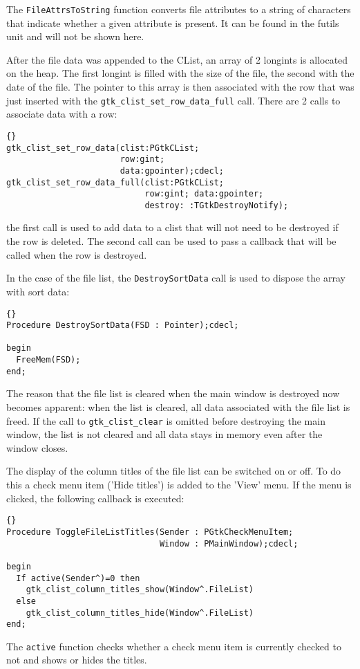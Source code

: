 \documentclass[10pt]{article}
\newcommand{\file}[1]{\textsf{#1}}
\begin{document}
The \lstinline|FileAttrsToString| function converts file attributes to a
string of characters that indicate whether a given attribute is present.
It can be found in the \file{futils} unit and will not be shown here.

After the file data was appended to the CList, an array of 2 longints is
allocated on the heap. The first longint is filled with the size of the
file, the second with the date of the file. The pointer to this array is
then associated with the row that was just inserted with the
\lstinline|gtk_clist_set_row_data_full| call. There are 2 calls to
associate data with a row:
\begin{lstlisting}{}
gtk_clist_set_row_data(clist:PGtkCList; 
                       row:gint; 
                       data:gpointer);cdecl;
gtk_clist_set_row_data_full(clist:PGtkCList; 
                            row:gint; data:gpointer; 
                            destroy: :TGtkDestroyNotify);
\end{lstlisting}
the first call is used to add data to a clist that will not need to be
destroyed if the row is deleted. The second call can be used to pass a
callback that will be called when the row is destroyed. 

In the case of the file list, the \lstinline|DestroySortData| call is
used to dispose the array with sort data:
\begin{lstlisting}{}
Procedure DestroySortData(FSD : Pointer);cdecl;
 
begin
  FreeMem(FSD);
end;                                                                            
\end{lstlisting}
The reason that the file list is cleared when the main window is destroyed
now becomes apparent: when the list is cleared, all data associated with
the file list is freed. If the call to \lstinline|gtk_clist_clear| is
omitted before destroying the main window, the list is not cleared and all
data stays in memory even after the window closes.

The display of the column titles of the file list can be switched on or off.
To do this a check menu item ('Hide titles') is added to the 'View' menu. 
If the menu is clicked, the following callback is executed:
\begin{lstlisting}{}
Procedure ToggleFileListTitles(Sender : PGtkCheckMenuItem;
                               Window : PMainWindow);cdecl;

begin
  If active(Sender^)=0 then
    gtk_clist_column_titles_show(Window^.FileList)
  else  
    gtk_clist_column_titles_hide(Window^.FileList)
end;
\end{lstlisting}
The \lstinline|active| function checks whether a check menu item is currently 
checked to not and shows or hides the titles. 
\end{document}
